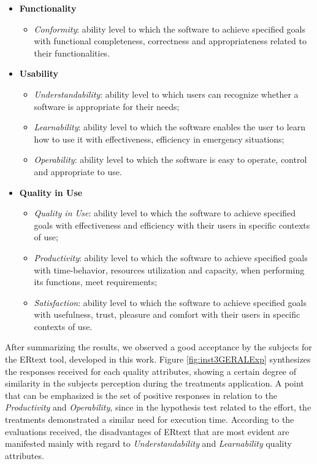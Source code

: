 \begin{itemize}
    \item \textbf{Functionality} 
        \begin{itemize}
            \item \textit{Conformity}: ability level to which the software to achieve specified goals with  functional completeness, correctness and appropriateness related to their functionalities.
        \end{itemize}
    \item \textbf{Usability}
        \begin{itemize}
            \item \textit{Understandability}: ability level to which users can recognize whether a software is appropriate for their needs; 
            \item \textit{Learnability}: ability level to which the software enables the user to learn how to use it with effectiveness, efficiency in emergency situations;
            \item \textit{Operability}: ability level to which the software is easy to operate, control and appropriate to use.
        \end{itemize}
    \item \textbf{Quality in Use}
        \begin{itemize}
            \item \textit{Quality in Use}: ability level to which the software to achieve specified goals with effectiveness and efficiency with their users in specific contexts of use;
            \item \textit{Productivity}: ability level to which the software to achieve specified goals with time-behavior, resources utilization and capacity, when performing its functions, meet requirements;
            \item \textit{Satisfaction}: ability level to which the software to achieve specified goals with usefulness, trust, pleasure and comfort with their users in specific contexts of use.
        \end{itemize}
\end{itemize}

After summarizing the results, we observed a good acceptance by the subjects for the ERtext tool, developed in this work.
Figure \ref{fig:inst3GERALExp} synthesizes the responses received for each quality attributes, showing a certain degree of similarity in the subjects perception during the treatments application.
A point that can be emphasized is the set of positive responses in relation to the \textit{Productivity} and \textit{Operability}, since in the hypothesis test related to the effort, the treatments demonstrated a similar need for execution time.
According to the evaluations received, the disadvantages of ERtext that are most evident are manifested mainly with regard to \textit{Understandability} and \textit{Learnability} quality attributes.

